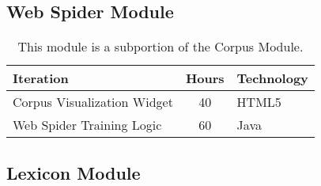 \documentclass[12 pt]{article}
\begin{document}



\newpage
\subsection{Web Spider Module}

\footnotesize
\begin{table}[htbp]
\begin{center}
  \begin{tabular}{ | lcl | }
\hline
Iteration&	Hours&	Technology	\\
\hline
Corpus Visualization Widget&	40&	HTML5	\\ 
Web Spider Training Logic&	60&	Java	\\ 
\hline
  \end{tabular}
  \caption{This module is a subportion of the Corpus Module.}
  \label{tab:label}
  \end{center}
\end{table}


\newpage
\subsection{Lexicon Module}
\end{document}
